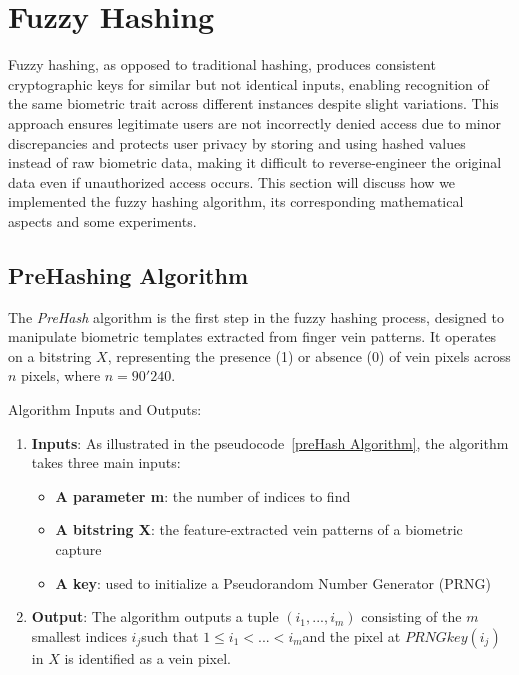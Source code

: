 


\section{Fuzzy Hashing}
\label{sec:Fuzzy Hashing}
Fuzzy hashing, as opposed to traditional hashing, produces consistent cryptographic keys for similar but not identical inputs, enabling recognition of the same biometric trait across different instances despite slight variations. This approach ensures legitimate users are not incorrectly denied access due to minor discrepancies and protects user privacy by storing and using hashed values instead of raw biometric data, making it difficult to reverse-engineer the original data even if unauthorized access occurs. 
This section will discuss how we implemented the fuzzy hashing algorithm, its corresponding mathematical aspects and some experiments.

\subsection{PreHashing Algorithm}

The \textit{PreHash} algorithm is the first step in the fuzzy hashing process, designed to manipulate biometric templates extracted from finger vein patterns. It operates on a bitstring \(X\), representing the presence (1) or absence (0) of vein pixels across \(n\) pixels, where \(n=90'240\).

Algorithm Inputs and Outputs:
\begin{enumerate}
    \item \textbf{Inputs}: As illustrated in the pseudocode~\ref{preHash Algorithm}, the algorithm takes three main inputs:
    \begin{itemize}
        \item \textbf{A parameter m}: the number of indices to find
        \item \textbf{A bitstring X}: the feature-extracted vein patterns of a biometric capture
        \item \textbf{A key}: used to initialize a Pseudorandom Number Generator (PRNG)
    \end{itemize}
    \item \textbf{Output}: The algorithm outputs a tuple \((i_1,...,i_m)\) consisting of the \(m\) smallest indices \(i_j\)​ such that \(1 \leq i_1<...<i_m\)​ and the pixel at \(PRNGkey(i_j)\) in \(X\) is identified as a vein pixel. 
\end{enumerate}

